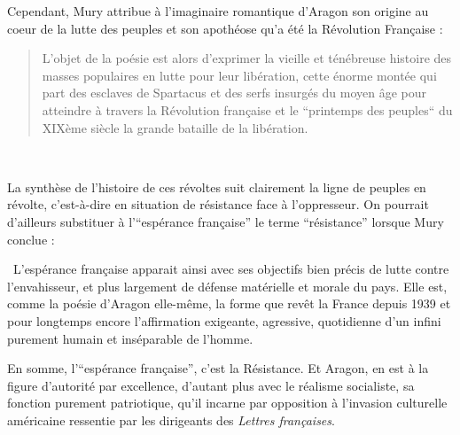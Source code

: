Cependant, Mury attribue à l’imaginaire romantique d’Aragon son origine au coeur de la lutte des peuples et son apothéose qu’a été la Révolution Française : 

\begin{quote}
 L’objet de la poésie est alors d’exprimer la vieille et ténébreuse histoire des masses populaires en lutte pour leur libération, cette énorme montée qui part des esclaves de Spartacus et des serfs insurgés du moyen âge pour atteindre à travers la Révolution française et le “printemps des peuples“ du XIXème siècle la grande bataille de la libération.   
\end{quote} 

 La synthèse de l’histoire de ces révoltes suit clairement la ligne de peuples en révolte, c’est-à-dire en situation de résistance face à l’oppresseur. On pourrait d’ailleurs substituer à l’\enquote{espérance française} le terme \enquote{résistance} lorsque Mury conclue : 

 L’espérance française apparait ainsi avec ses objectifs bien précis de lutte contre l’envahisseur, et plus largement de défense matérielle et morale du pays. Elle est, comme la poésie d’Aragon elle-même, la forme que revêt la France depuis 1939 et pour longtemps encore l’affirmation exigeante, agressive, quotidienne d’un infini purement humain et inséparable de l’homme.

	 En somme, l’\enquote{espérance française}, c’est la Résistance. Et Aragon, en est à la figure d’autorité par excellence, d’autant plus avec le réalisme socialiste, sa fonction purement patriotique, qu’il incarne par opposition à l’invasion culturelle américaine ressentie par les dirigeants des \emph{Lettres françaises}. 

